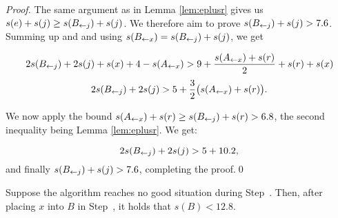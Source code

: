 \begin{proof}

The same argument as in Lemma \ref{lem:eplusr} gives us $s(e) + s(j) \ge  s(B_{\leftarrow j}) + s(j)$.
We therefore aim to prove $s(B_{\leftarrow j}) + s(j) > 7.6$. Summing up 
and  and using $s(B_{\leftarrow x}) = s(B_{\leftarrow j}) + s(j)$, we get

\[ 2s(B_{\leftarrow j}) + 2s(j) + s(x) + 4 - s(A_{\leftarrow x}) > 9 + \frac{s(A_{\leftarrow x}) + s(r)}{2} + s(r) + s(x)\]
\[ 2s(B_{\leftarrow j}) + 2s(j) > 5 + \frac32 \big(s(A_{\leftarrow x})  + s(r)\big).\]

We now apply the bound $s(A_{\leftarrow x}) + s(r) \ge  s(B_{\leftarrow j}) + s(r) > 6.8$, the second inequality being Lemma \ref{lem:eplusr}. We get:

\[ 2s(B_{\leftarrow j})+ 2s(j) > 5+ 10.2, \]
and finally $s(B_{\leftarrow j}) + s(j) > 7.6$, completing the proof.\qed

\end{proof}

%
%
%

\begin{lem}
Suppose the algorithm \tbalg reaches no good situation during Step~{\rm {}}.
Then, after placing $x$ into $B$ in Step~{\rm {}}, it holds that $s(B) < 12.8$.
\end{lem}

